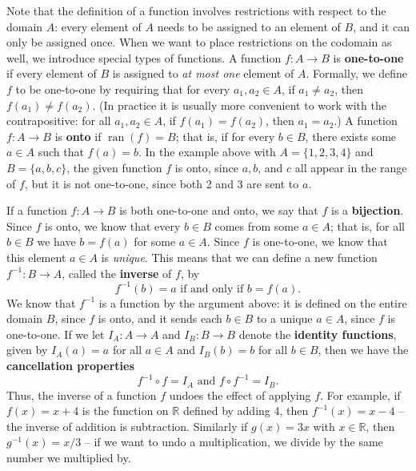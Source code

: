 \documentclass[letterpaper,12pt]{article}
\newcommand{\R}{\mathbb{R}}
\DeclareMathOperator{\ran}{ran}
\begin{document}
Note that the definition of a function involves restrictions with respect to the domain $A$: every element of $A$ needs to be assigned to an element of $B$, and it can only be assigned once. When we want to place restrictions on the codomain as well, we introduce special types of functions. A function $f:A\to B$ is {\bf one-to-one} if every element of $B$ is assigned to {\em at most one} element of $A$. Formally, we define $f$ to be one-to-one by requiring that for every $a_1,a_2\in A$, if $a_1\neq a_2$, then $f(a_1)\neq f(a_2)$. (In practice it is usually more convenient to work with the contrapositive: for all $a_1, a_2\in A$, if $f(a_1)=f(a_2)$, then $a_1=a_2$.) A function $f:A\to B$ is {\bf onto} if $\ran(f)=B$; that is, if for every $b\in B$, there exists some $a\in A$ such that $f(a)=b$. In the example above with $A=\{1,2,3,4\}$ and $B = \{a,b,c\}$, the given function $f$ is onto, since $a, b$, and $c$ all appear in the range of $f$, but it is not one-to-one, since both 2 and 3 are sent to $a$.

If a function $f:A\to B$ is both one-to-one and onto, we say that $f$ is a {\bf bijection}. Since $f$ is onto, we know that every $b\in B$ comes from some $a\in A$; that is, for all $b\in B$ we have $b=f(a)$ for some $a\in A$. Since $f$ is one-to-one, we know that this element $a\in A$ is {\em unique}. This means that we can define a new function $f^{-1}:B\to A$, called the {\bf inverse} of $f$, by
\[
 f^{-1}(b) = a \text{ if and only if } b = f(a).
\]
We know that $f^{-1}$ is a function by the argument above: it is defined on the entire domain $B$, since $f$ is onto, and it sends each $b\in B$ to a unique $a\in A$, since $f$ is one-to-one. If we let $I_A:A\to A$ and $I_B:B\to B$ denote the {\bf identity functions}, given by $I_A(a) = a$ for all $a\in A$ and $I_B(b) = b$ for all $b\in B$, then we have the {\bf cancellation properties}
\[
 f^{-1}\circ f = I_A \text{ and } f\circ f^{-1} = I_B.
\]
Thus, the inverse of a function $f$ undoes the effect of applying $f$. For example, if $f(x) = x+4$ is the function on $\R$ defined by adding 4, then $f^{-1}(x)=x-4$ -- the inverse of addition is subtraction. Similarly if $g(x) = 3x$ with $x\in \R$, then $g^{-1}(x) = x/3$ -- if we want to undo a multiplication, we divide by the same number we multiplied by.
\end{document}
